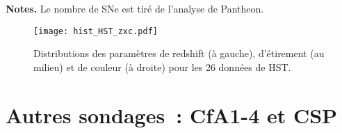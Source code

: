 \documentclass[../main/main.tex]{subfiles}
\begin{document}
\begin{table}[]
    \centering
        \caption[Nombre de SNe~Ia de notre échantillon HST selon la
        source]{Nombre de SNe~Ia composant notre échantillon HST selon les
        sondages à haut redshifts.}
        \label{tab:hstcuts}
    \begin{threeparttable}
        \begin{tablenotes}[flushleft]
        \item\small \textbf{\hspace{-3,2pt}Notes.} Le nombre de SNe est tiré de
            l'analyse de Pantheon.
        \end{tablenotes}
    \end{threeparttable}
\end{table}

\begin{figure}[]
    \centering
    \texttt{[image: hist\_HST\_zxc.pdf]}
    \caption[Distributions des paramètres de redshift, étirement et couleur de
    HST]{Distributions des paramètres de redshift (à gauche), d'étirement (au
    milieu) et de couleur (à droite) pour les 26 données de HST.}
    \label{fig:hsthist}
\end{figure}

\section{Autres sondages~: CfA1-4 et CSP}\label{sec:lowz}
\end{document}
